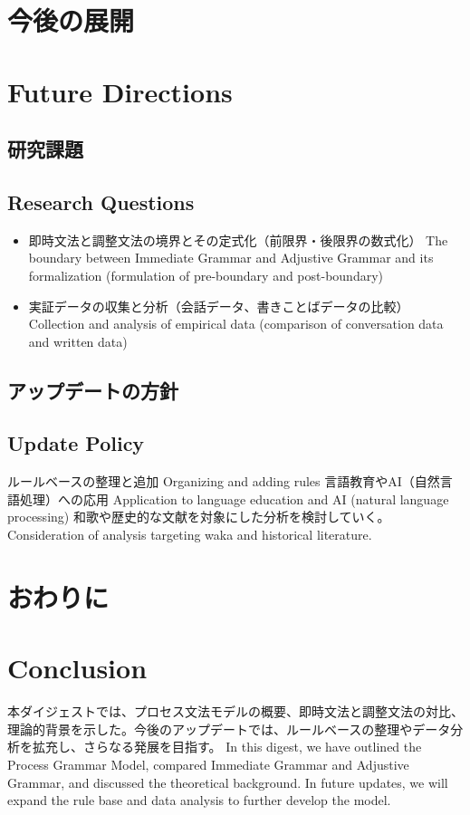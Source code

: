 \documentclass[a4paper,xelatex,ja=standard]{bxjsarticle}
\begin{document}
\ifJPN
  \section{今後の展開}
\else
  \section{Future Directions}
\fi

\ifJPN
  \subsection{研究課題}
\else
  \subsection{Research Questions}
\fi

\begin{itemize}
  \item 
\ifJPN
即時文法と調整文法の境界とその定式化（前限界・後限界の数式化）
\else
The boundary between Immediate Grammar and Adjustive Grammar and its formalization (formulation of pre-boundary and post-boundary)
\fi

  \item 
\ifJPN
実証データの収集と分析（会話データ、書きことばデータの比較）
\else
Collection and analysis of empirical data (comparison of conversation data and written data)
\fi
\end{itemize}

\ifJPN
  \subsection{アップデートの方針}
\else
  \subsection{Update Policy}
\fi

\ifJPN
ルールベースの整理と追加
\else
Organizing and adding rules
\fi
\ifJPN
言語教育やAI（自然言語処理）への応用
\else
Application to language education and AI (natural language processing)
\fi
\ifJPN
和歌や歴史的な文献を対象にした分析を検討していく。
\else
Consideration of analysis targeting waka and historical literature.
\fi

\ifJPN
  \section{おわりに}
\else
  \section{Conclusion}
\fi

\ifJPN
本ダイジェストでは、プロセス文法モデルの概要、即時文法と調整文法の対比、理論的背景を示した。今後のアップデートでは、ルールベースの整理やデータ分析を拡充し、さらなる発展を目指す。
\else
In this digest, we have outlined the Process Grammar Model, compared Immediate Grammar and Adjustive Grammar, and discussed the theoretical background. In future updates, we will expand the rule base and data analysis to further develop the model.
\fi




\printbibliography
\end{document}
